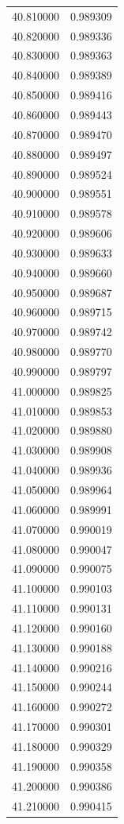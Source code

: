 \begin{tabular}{rr}
40.810000 & 0.989309 \\
40.820000 & 0.989336 \\
40.830000 & 0.989363 \\
40.840000 & 0.989389 \\
40.850000 & 0.989416 \\
40.860000 & 0.989443 \\
40.870000 & 0.989470 \\
40.880000 & 0.989497 \\
40.890000 & 0.989524 \\
40.900000 & 0.989551 \\
40.910000 & 0.989578 \\
40.920000 & 0.989606 \\
40.930000 & 0.989633 \\
40.940000 & 0.989660 \\
40.950000 & 0.989687 \\
40.960000 & 0.989715 \\
40.970000 & 0.989742 \\
40.980000 & 0.989770 \\
40.990000 & 0.989797 \\
41.000000 & 0.989825 \\
41.010000 & 0.989853 \\
41.020000 & 0.989880 \\
41.030000 & 0.989908 \\
41.040000 & 0.989936 \\
41.050000 & 0.989964 \\
41.060000 & 0.989991 \\
41.070000 & 0.990019 \\
41.080000 & 0.990047 \\
41.090000 & 0.990075 \\
41.100000 & 0.990103 \\
41.110000 & 0.990131 \\
41.120000 & 0.990160 \\
41.130000 & 0.990188 \\
41.140000 & 0.990216 \\
41.150000 & 0.990244 \\
41.160000 & 0.990272 \\
41.170000 & 0.990301 \\
41.180000 & 0.990329 \\
41.190000 & 0.990358 \\
41.200000 & 0.990386 \\
41.210000 & 0.990415 \\

\end{tabular}
